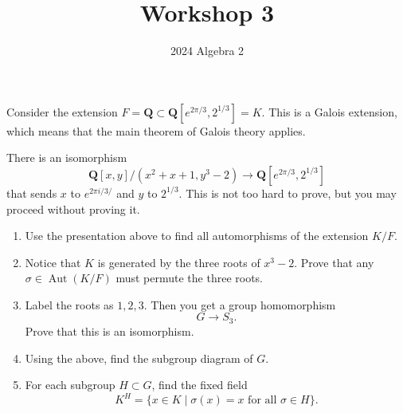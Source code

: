 \documentclass[12pt]{amsart}
\author{2024 Algebra 2}
\date{}
\title{Workshop 3}
\begin{document}
\maketitle
Consider the extension \(F = \mathbf{Q} \subset \mathbf{Q}[e^{2\pi/3}, 2^{1/3}] = K\).
This is a Galois extension, which means that the main theorem of Galois theory applies.

There is an isomorphism
\[ \mathbf{Q}[x,y]/(x^2+x+1, y^3-2) \to \mathbf{Q}[e^{2\pi/3}, 2^{1/3}]\]
that sends \(x\) to \(e^{2\pi i /3/}\) and \(y\) to \(2^{1/3}\).
This is not too hard to prove, but you may proceed without proving it.

\begin{enumerate}
\item Use the presentation above to find all automorphisms of the extension \(K/F\).

\item Notice that \(K\) is generated by the three roots of \(x^3-2\).
Prove that any \(\sigma \in \operatorname{Aut}(K/F)\) must permute the three roots.

\item Label the roots as \(1, 2, 3\).
Then you get a group homomorphism
\[ G  \to S_3.\]
Prove that this is an isomorphism.

\item Using the above, find the subgroup diagram of \(G\).

\item For each subgroup \(H \subset G\), find the fixed field
\[ K^H = \{x \in K \mid \sigma (x) = x \text{ for all } \sigma \in H\}.\]
\end{enumerate}
\end{document}
